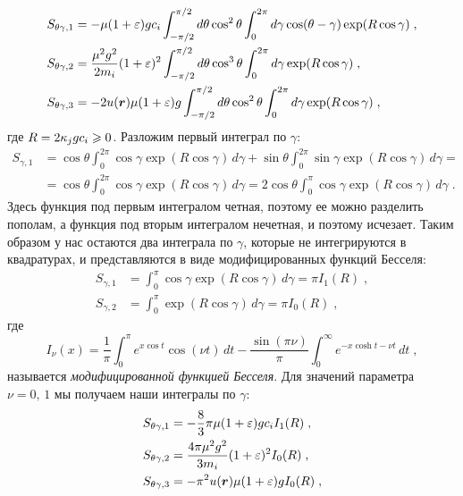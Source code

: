 \begin{equation}
  \begin{split}
    S_{\theta\gamma,1} &= -\mu(1+\varepsilon)gc_i\int_{-\pi/2}^{\pi/2}d\theta\cos^2\theta\int_{0}^{2\pi}d\gamma\cos(\theta-\gamma)\exp(R\cos\gamma)\;,\\
    S_{\theta\gamma,2} &= \frac{\mu^2g^2}{2m_i}(1+\varepsilon)^2\int_{-\pi/2}^{\pi/2}d\theta\cos^3\theta\int_0^{2\pi}d\gamma\exp(R\cos\gamma)\;, \\
    S_{\theta\gamma,3} &= -2u(\bm{r})\mu(1+\varepsilon)g\int_{-\pi/2}^{\pi/2}d\theta\cos^2\theta\int_0^{2\pi}d\gamma\exp(R\cos\gamma)\;,
  \end{split}
\end{equation}
где $R=2\kappa_jgc_i\geqslant 0$. Разложим первый интеграл по $\gamma$:
\begin{equation}
  \begin{split}
    S_{\gamma,1} &= \cos\theta\int_{0}^{2\pi}\cos\gamma\exp(R\cos\gamma)\,d\gamma+\sin\theta\int_{0}^{2\pi}\sin\gamma\exp(R\cos\gamma)\,d\gamma=\\
    &=\cos\theta\int_{0}^{2\pi}\cos\gamma\exp(R\cos\gamma)\,d\gamma = 2\cos\theta\int_{0}^{\pi}\cos\gamma\exp(R\cos\gamma)\,d\gamma\;.
  \end{split}
\end{equation}
Здесь функция под первым интегралом четная, поэтому ее можно разделить пополам, а функция под вторым интегралом нечетная, и поэтому исчезает.
Таким образом у нас остаются два интеграла по $\gamma$, которые не интегрируются в квадратурах, и представляются в виде модифицированных функций 
Бесселя:
\begin{equation}
  \begin{split}
    S_{\gamma,1} &= \int_{0}^{\pi}\cos\gamma\exp(R\cos\gamma)\,d\gamma = \pi I_1(R)\;,\\
    S_{\gamma,2} &= \int_{0}^{\pi}\exp(R\cos\gamma)\,d\gamma = \pi I_0(R)\;,
  \end{split}
\end{equation}
где
\begin{equation}
  I_\nu(x) = \frac{1}{\pi}\int_{0}^{\pi}e^{x\cos t}\cos(\nu t)\,dt-\frac{\sin(\pi\nu)}{\pi}\int_{0}^{\infty}e^{-x\cosh t-\nu t}\,dt\;,
\end{equation}
называется \emph{модифицированной функцией Бесселя}. Для значений параметра $\nu=0,\,1$ мы получаем наши интегралы по $\gamma$:
\begin{equation}
  \begin{split}
    S_{\theta\gamma,1} &= -\frac{8}{3}\pi\mu(1+\varepsilon)gc_iI_1(R)\;,\\
    S_{\theta\gamma,2} &= \frac{4\pi\mu^2g^2}{3m_i}(1+\varepsilon)^2I_0(R)\;,\\
    S_{\theta\gamma,3} &= -\pi^2u(\bm{r})\mu(1+\varepsilon)gI_0(R)\;,
  \end{split}
\end{equation}
